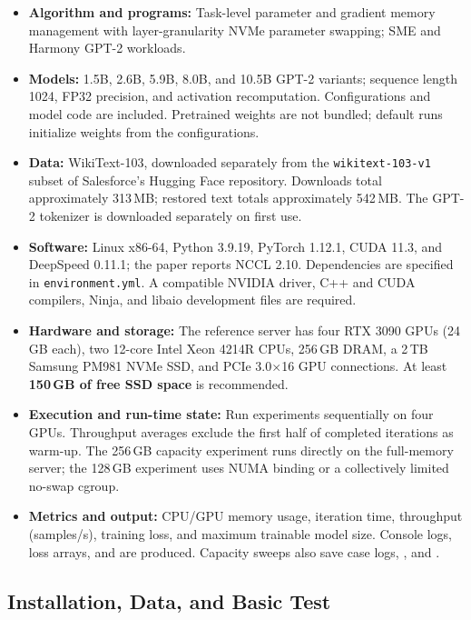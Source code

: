 \begin{itemize}
  \item \textbf{Algorithm and programs:} Task-level parameter and
  gradient memory management with layer-granularity NVMe parameter
  swapping; SME and Harmony GPT-2 workloads.
  \item \textbf{Models:} 1.5B, 2.6B, 5.9B, 8.0B, and 10.5B GPT-2
  variants; sequence length 1024, FP32 precision, and activation
  recomputation. Configurations and model code are included.
  Pretrained weights are not bundled; default runs initialize
  weights from the configurations.
  \item \textbf{Data:} WikiText-103, downloaded separately from the
  \texttt{wikitext-103-v1} subset of Salesforce's Hugging Face
  repository. Downloads total approximately 313\,MB; restored text
  totals approximately 542\,MB. The GPT-2 tokenizer is downloaded
  separately on first use.
  \item \textbf{Software:} Linux x86-64, Python
  3.9.19, PyTorch 1.12.1, CUDA 11.3, and DeepSpeed 0.11.1; the paper
  reports NCCL 2.10. Dependencies are specified in
  \texttt{environment.yml}. A compatible NVIDIA driver, C++ and
  CUDA compilers, Ninja, and libaio development files are required.
  \item \textbf{Hardware and storage:} The reference server has
  four RTX 3090 GPUs (24\,GB each), two 12-core Intel Xeon 4214R
  CPUs, 256\,GB DRAM, a 2\,TB Samsung PM981 NVMe SSD, and PCIe
  3.0$\times$16 GPU connections. At least \textbf{150\,GB of free
  SSD space} is recommended.
  \item \textbf{Execution and run-time state:} Run experiments
  sequentially on four GPUs. Throughput averages exclude the first
  half of completed iterations as warm-up. The 256\,GB capacity
  experiment runs directly on the full-memory server; the 128\,GB
  experiment uses NUMA binding or a collectively limited no-swap
  cgroup.
  \item \textbf{Metrics and output:} CPU/GPU memory usage, iteration
  time, throughput (samples/s), training loss, and maximum trainable
  model size. Console logs, loss arrays, and 
  are produced. Capacity sweeps also save case logs,
  , and .
\end{itemize}

\subsection{Installation, Data, and Basic Test}

